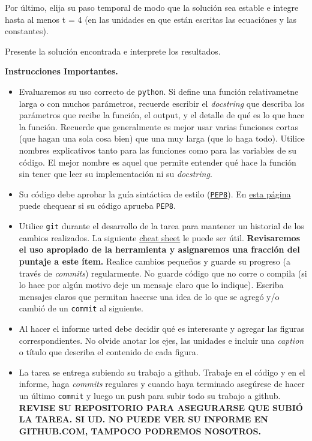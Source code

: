 \documentclass[letter, 11pt]{article}
\begin{document}
Por último, elija su paso temporal de modo que la solución sea estable e
integre hasta al menos t = 4 (en las unidades en que están escritas las
ecuaciónes y las constantes).

Presente la solución encontrada e interprete los resultados.


\vspace{2em}
\noindent\textbf{Instrucciones Importantes.}
\begin{itemize}

\item Evaluaremos su uso correcto de \texttt{python}. Si define una función
  relativametne larga o con muchos parámetros, recuerde escribir el
  \emph{docstring} que describa los parámetros que recibe la función, el
  output, y el detalle de qué es lo que hace la función. Recuerde que
  generalmente es mejor usar varias funciones cortas (que hagan una sola cosa
  bien) que una muy larga (que lo haga todo).  Utilice nombres explicativos
  tanto para las funciones como para las variables de su código. El mejor
  nombre es aquel que permite entender qué hace la función sin tener que leer
  su implementación ni su \emph{docstring}.

\item Su código debe aprobar la guía sintáctica de estilo
  (\href{https://www.python.org/dev/peps/pep-0008/}{\texttt{PEP8}}). En
  \href{http://pep8online.com}{esta página} puede chequear si su código aprueba
  \texttt{PEP8}.

\item Utilice \texttt{git} durante el desarrollo de la tarea para mantener un
  historial de los cambios realizados. La siguiente
  \href{https://education.github.com/git-cheat-sheet-education.pdf}{cheat
    sheet} le puede ser útil. {\bf Revisaremos el uso apropiado de la
  herramienta y asignaremos una fracción del puntaje a este ítem.} Realice
  cambios pequeños y guarde su progreso (a través de \emph{commits})
  regularmente. No guarde código que no corre o compila (si lo hace por algún
  motivo deje un mensaje claro que lo indique). Escriba mensajes claros que
  permitan hacerse una idea de lo que se agregó y/o cambió de un
  \texttt{commit} al siguiente.

\item Al hacer el informe usted debe decidir qué es interesante y agregar las
  figuras correspondientes. No olvide anotar los ejes, las unidades e incluir
  una \emph{caption} o título que describa el contenido de cada figura.

\item La tarea se entrega subiendo su trabajo a github. Trabaje en el código y
  en el informe, haga \textit{commits} regulares y cuando haya terminado
  asegúrese de hacer un último \texttt{commit} y luego un \texttt{push} para
  subir todo su trabajo a github. \textbf{REVISE SU REPOSITORIO PARA ASEGURARSE
  QUE SUBIÓ LA TAREA. SI UD. NO PUEDE VER SU INFORME EN GITHUB.COM, TAMPOCO
PODREMOS NOSOTROS.}


\end{itemize}
\end{document}

